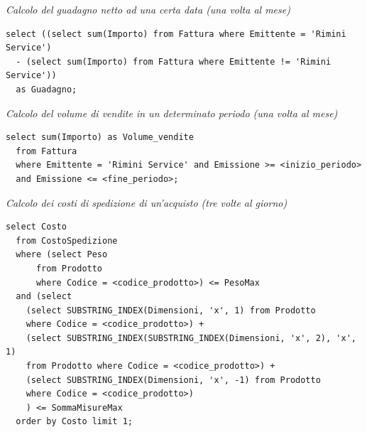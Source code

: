 \noindent{}
\newline\newline

\noindent\textit{Calcolo del guadagno netto ad una certa data (una volta al mese)}
\begin{verbatim}
select ((select sum(Importo) from Fattura where Emittente = 'Rimini Service')
  - (select sum(Importo) from Fattura where Emittente != 'Rimini Service'))
  as Guadagno;
\end{verbatim}
\vspace{0.5cm}

\noindent{}
\newline\newline

\noindent\textit{Calcolo del volume di vendite in un determinato periodo (una volta al mese)}
\begin{verbatim}
select sum(Importo) as Volume_vendite
  from Fattura
  where Emittente = 'Rimini Service' and Emissione >= <inizio_periodo>
  and Emissione <= <fine_periodo>;
\end{verbatim}
\vspace{0.5cm}

\noindent{}
\newline\newline

\noindent\textit{Calcolo dei costi di spedizione di un'acquisto (tre volte al giorno)}
\begin{verbatim}
select Costo
  from CostoSpedizione
  where (select Peso
      from Prodotto
      where Codice = <codice_prodotto>) <= PesoMax
  and (select
    (select SUBSTRING_INDEX(Dimensioni, 'x', 1) from Prodotto
    where Codice = <codice_prodotto>) +
    (select SUBSTRING_INDEX(SUBSTRING_INDEX(Dimensioni, 'x', 2), 'x', 1)
    from Prodotto where Codice = <codice_prodotto>) +
    (select SUBSTRING_INDEX(Dimensioni, 'x', -1) from Prodotto
    where Codice = <codice_prodotto>)
    ) <= SommaMisureMax
  order by Costo limit 1;
\end{verbatim}
\vspace{0.5cm}

